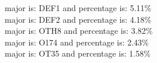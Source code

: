major is: DEF1 and percentage is: 5.11\% \\
major is: DEF2 and percentage is: 4.18\% \\
major is: OTH8 and percentage is: 3.82\% \\
major is: O174 and percentage is: 2.43\% \\
major is: OT35 and percentage is: 1.58\% \\
